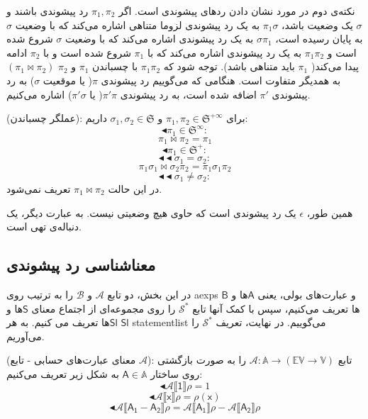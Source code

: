 نکته‌ی دوم در مورد نشان دادن ردهای پیشوندی است. اگر $\pi_1,\pi_2$ رد پیشوندی باشند و $\sigma$ یک وضعیت باشد، $\pi_1\sigma$ به یک رد پیشوندی لزوما متناهی اشاره می‌کند که با وضعیت $\sigma$ به پایان رسیده است،
$\sigma\pi_1$
به یک رد پیشوندی اشاره می‌کند که با وضعیت $\sigma$ شروع شده است و $\pi_1\pi_2$ به یک رد پیشوندی اشاره می‌کند که با $\pi_1$ شروع شده است و با $\pi_2$ ادامه پیدا می‌کند( $\pi_1$ باید متناهی باشد). توجه شود که $\pi_1\pi_2$ با چسباندن $\pi_1$ و $\pi_2$ $(\pi_1 \Join \pi_2)$به همدیگر متفاوت است. هنگامی که می‌گوییم رد پیشوندی $\pi$( یا موقعیت $\sigma$) به رد پیشوندی $\pi'$ اضافه شده است، به رد پیشوندی $\pi'\pi$( یا $\pi'\sigma$) اشاره می‌کنیم.

\begin{defn}
	(عملگر چسباندن): برای 
	$\pi_1 , \pi_2 \in \mathfrak{S^{+\infty}}$ 
	و
	  $\sigma_1 ,\sigma_2 \in \mathfrak{S}$
	داریم:
		$$\blacktriangleleft \pi_1 \in \mathfrak{S}^\infty:$$
		$$\pi_1 \Join \pi_2 = \pi_1$$
		$$\blacktriangleleft \pi_1 \in \mathfrak{S}^+:$$
		$$\blacktriangleleft \blacktriangleleft \sigma_1 = \sigma_2:$$
		$$\pi_1\sigma_1 \Join \sigma_2 \pi_2 = \pi_1 \sigma_1 \pi_2$$
		$$\blacktriangleleft \blacktriangleleft \sigma_1 \neq \sigma_2:$$
		در این حالت 
		$\pi_1 \Join \pi_2$
		تعریف نمی‌شود.
\end{defn}
همین طور، $\epsilon$ یک رد پیشوندی است که حاوی هیچ وضعیتی نیست. به عبارت دیگر، یک دنباله‌ی تهی است.

\subsection{معناشناسی رد پیشوندی}
در این بخش، دو تابع $\mathcal{A}$ و $\mathcal{B}$ را به ترتیب روی \glspl{aexp} و عبارت‌های بولی، یعنی $\mathsf{A}$ها و $\mathsf{B}$ها تعریف می‌کنیم، سپس با کمک آنها تابع $\mathcal{S^*}$ را روی  مجموعه‌ای از اجتماع معنای $\mathsf{S}$ها و $\mathsf{Sl}$ها تعریف می کنیم. به هر $\mathsf{Sl}$ \gls{statementlist} می‌گوییم. در نهایت، تعریف  $\mathcal{S^*}$ را می‌آوریم.


\begin{defn}
	(معنای عبارت‌های حسابی - تابع $\mathcal{A}$): تابع 
	$\mathcal{A}:\mathbb{A}\rightarrow (\mathbb{EV} \rightarrow \mathbb{V})$
	را به صورت بازگشتی روی ساختار 
	$\mathsf{A} \in \mathbb{A}$
	به شکل زیر تعریف می‌کنیم:
	$$\blacktriangleleft\mathcal{A\llbracket\mathsf{1}\rrbracket\rho = }1     $$
	$$\blacktriangleleft\mathcal{A\llbracket\mathsf{x}\rrbracket\rho = } \rho(\mathsf{x})          $$
	$$\blacktriangleleft\mathcal{A\llbracket\mathsf{A_1-A_2}\rrbracket\rho = }\mathcal{A\llbracket\mathsf{A_1}\rrbracket\rho }- \mathcal{A\llbracket\mathsf{A_2}\rrbracket\rho }       $$
	
\end{defn}

